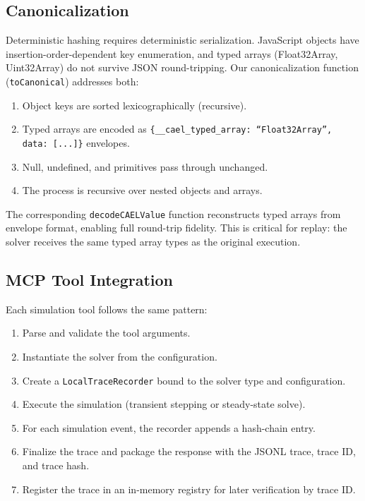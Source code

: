 \documentclass[letterpaper,twocolumn,10pt]{article}
\begin{document}
\subsection{Canonicalization}

Deterministic hashing requires deterministic serialization. JavaScript
objects have insertion-order-dependent key enumeration, and typed arrays
(Float32Array, Uint32Array) do not survive JSON round-tripping. Our
canonicalization function (\texttt{toCanonical}) addresses both:

\begin{enumerate}[nosep,leftmargin=*]
\item Object keys are sorted lexicographically (recursive).
\item Typed arrays are encoded as \texttt{\{\_\_cael\_typed\_array:
  ``Float32Array'', data: [...]\}} envelopes.
\item Null, undefined, and primitives pass through unchanged.
\item The process is recursive over nested objects and arrays.
\end{enumerate}

The corresponding \texttt{decodeCAELValue} function reconstructs typed
arrays from envelope format, enabling full round-trip fidelity. This is
critical for replay: the solver receives the same typed array types as the
original execution.

\subsection{MCP Tool Integration}

Each simulation tool follows the same pattern:

\begin{enumerate}[nosep,leftmargin=*]
\item Parse and validate the tool arguments.
\item Instantiate the solver from the configuration.
\item Create a \texttt{LocalTraceRecorder} bound to the solver type and
  configuration.
\item Execute the simulation (transient stepping or steady-state solve).
\item For each simulation event, the recorder appends a hash-chain entry.
\item Finalize the trace and package the response with the JSONL trace,
  trace ID, and trace hash.
\item Register the trace in an in-memory registry for later verification
  by trace ID.
\end{enumerate}
\end{document}
